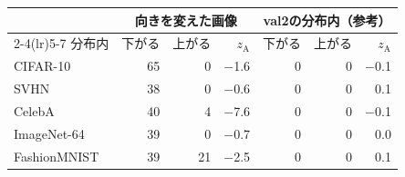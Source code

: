 \documentclass[border=3pt]{standalone}
\begin{document}
%
\begin{tabular}{lrrrrrr}%
\toprule
 & \multicolumn{3}{c}{向きを変えた画像} & \multicolumn{3}{c}{val2の分布内（参考）}\\
\cmidrule(lr){2-4}\cmidrule(lr){5-7}
分布内 & 下がる & 上がる & $z_{\mathrm{A}}$ & 下がる & 上がる & $z_{\mathrm{A}}$\\
\midrule
CIFAR-10 & 65 & 0 & $-$1.6 & 0 & 0 & $-$0.1\\
SVHN & 38 & 0 & $-$0.6 & 0 & 0 & 0.1\\
CelebA & 40 & 4 & $-$7.6 & 0 & 0 & $-$0.1\\
ImageNet-64 & 39 & 0 & $-$0.7 & 0 & 0 & 0.0\\
FashionMNIST & 39 & 21 & $-$2.5 & 0 & 0 & 0.1\\
\bottomrule
\end{tabular}%
\end{document}
